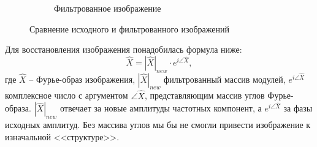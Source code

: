 \documentclass[a4paper, 12pt]{article}
\begin{document}
\begin{figure}[H]
\begin{subfigure}{0.45\textwidth}
            \caption{Фильтрованное изображение}
            \label{fig:new}
        \end{subfigure}
        \caption{Сравнение исходного и фильтрованного изображений}
        \label{fig:oldnew}
    \end{figure}


    Для восстановления изображения понадобилась формула ниже:
    $$
    \hat{X}=|\hat{X}|_{new}\cdot e^{i\angle\hat{X}},
    $$
    где $\hat{X}$ -- Фурье-образ изображения, $|\hat{X}|_{new}$ фильтрованный массив модулей,
    $e^{i\angle\hat{X}}$ комплексное число с аргументом $\angle\hat{X}$, представляющим массив углов
    Фурье-образа. $|\hat{X}|_{new}$ отвечает за новые амплитуды частотных компонент, а $e^{i\angle\hat{X}}$
    за фазы исходных амплитуд. Без массива углов мы бы не смогли привести изображение к изначальной <<структуре>>.
\end{document}
